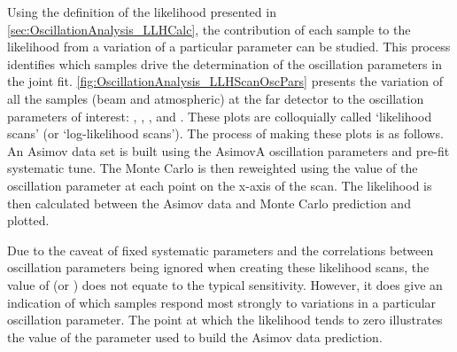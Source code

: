 Using the definition of the likelihood presented in \autoref{sec:OscillationAnalysis_LLHCalc}, the contribution of each sample to the likelihood from a variation of a particular parameter can be studied. This process identifies which samples drive the determination of the oscillation parameters in the joint fit.
\autoref{fig:OscillationAnalysis_LLHScanOscPars} presents the variation of all the samples (beam and atmospheric) at the far detector to the oscillation parameters of interest: , , , and . These plots are colloquially called `likelihood scans' (or `log-likelihood scans'). The process of making these plots is as follows. An Asimov data set is built using the AsimovA oscillation parameters and pre-fit systematic tune. The Monte Carlo is then reweighted using the value of the oscillation parameter at each point on the x-axis of the scan. The likelihood is then calculated between the Asimov data and Monte Carlo prediction and plotted. 

Due to the caveat of fixed systematic parameters and the correlations between oscillation parameters being ignored when creating these likelihood scans, the value of  (or ) does not equate to the typical \quickmath{1\sigma} sensitivity. However, it does give an indication of which samples respond most strongly to variations in a particular oscillation parameter. The point at which the likelihood tends to zero illustrates the value of the parameter used to build the Asimov data prediction.

